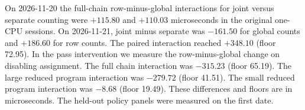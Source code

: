 On 2026-11-20 the full-chain row-minus-global interactions for joint versus separate counting were $+115.80$ and $+110.03$ microseconds in the original one-CPU sessions. On 2026-11-21, joint minus separate was $-161.50$ for global counts and $+186.60$ for row counts. The paired interaction reached $+348.10$ (floor 72.95). In the pass intervention we measure the row-minus-global change on disabling assignment. The full chain interaction was $-315.23$ (floor 65.19). The large reduced program interaction was $-279.72$ (floor 41.51). The small reduced program interaction was $-8.68$ (floor 19.49). These differences and floors are in microseconds. The held-out policy panels were measured on the first date.
